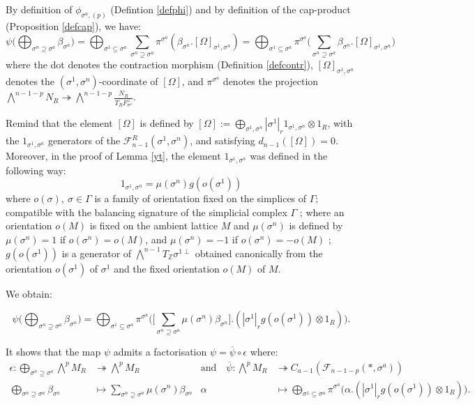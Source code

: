 \documentclass{article}
\begin{document}
By definition of $\phi_{\sigma^{a},(p)}$ (Defintion \ref{defphi}) and by definition of the cap-product (Proposition \ref{defcap}), we have:
\begin{equation*}
    \psi \Bigg( \bigoplus_{\sigma^n \supseteq \sigma^a} \beta_{\sigma^n} \Bigg) = \bigoplus_{\sigma^1 \subseteq \sigma^a} \sum_{\sigma^n \supseteq \sigma^a}\pi^{\sigma^a}(\beta_{\sigma^n}.[\Omega]_{\sigma^1,\sigma^n}) = \bigoplus_{\sigma^1 \subseteq \sigma^a} \pi^{\sigma^a} \Bigg( \sum_{\sigma^n \supseteq \sigma^a}\beta_{\sigma^n}.[\Omega]_{\sigma^1,\sigma^n} \Bigg)
\end{equation*}
where the dot denotes the contraction morphism (Definition \ref{defcontr}), $[\Omega]_{\sigma^1,\sigma^n}$ denotes the $(\sigma^1,\sigma^n)$-coordinate of $[\Omega]$, and $\pi^{\sigma^a}$ denotes the projection $\bigwedge^{n-1-p}N_R\twoheadrightarrow \bigwedge^{n-1-p}\frac{N_R}{T_RF_{\sigma^a}^{\perp}}$.

Remind that the element $[\Omega]$ is defined by $[\Omega]:=\bigoplus_{\sigma^1,\sigma^n} |\sigma^1|_r1_{\sigma^1,\sigma^n} \otimes 1_R$, with the $1_{\sigma^1,\sigma^n}$ generators of the $\mathcal{F}_{n-1}^R(\sigma^1,\sigma^n)$, and satisfying $d_{n-1}([\Omega]) =0$. Moreover, in the proof of Lemma \ref{yt}, the element $1_{\sigma^1,\sigma^n}$ was defined in the following way:
\begin{equation*}
    1_{\sigma^1,\sigma^n} = \mu(\sigma^n)g(o(\sigma^1))
\end{equation*}
where $o(\sigma), ~\sigma \in \Gamma$ is a family of orientation fixed on the simplices of $\Gamma$; compatible with the balancing signature of the simplicial complex $\Gamma$ ;  where an orientation $o(M)$ is fixed on the ambient lattice $M$ and $\mu(\sigma^n)$ is defined by $\mu(\sigma^n)=1$ if $o(\sigma^n)=o(M)$, and $\mu(\sigma^n)=-1$ if $o(\sigma^n)=-o(M)$ ; $g(o(\sigma^1))$ is a generator of $\bigwedge^{n-1}T_{\mathbb{Z}}\sigma^{1\perp}$ obtained canonically from the orientation $o(\sigma^1)$ of $\sigma^1$ and the fixed orientation $o(M)$ of $M$.

We obtain:

\begin{equation*}
    \psi \Bigg( \bigoplus_{\sigma^n \supseteq \sigma^a} \beta_{\sigma^n} \Bigg) = \bigoplus_{\sigma^1 \subseteq \sigma^a} \pi^{\sigma^a} \Bigg( \Bigg[ \sum_{\sigma^n \supseteq \sigma^a}\mu(\sigma^n)\beta_{\sigma^n}\Bigg].(|\sigma^1|_rg(o(\sigma^1))\otimes1_R) \Bigg).
\end{equation*}

It shows that the map $\psi$ admits a factorisation $\psi =\overline{\psi} \circ \epsilon$ where:
\begin{align*}
    \epsilon: \bigoplus_{\sigma^n \supseteq \sigma^a} \bigwedge^p M_R & \twoheadrightarrow \bigwedge^p M_R &\text{and }~~~ \overline{\psi}: \bigwedge^p M_R & \twoheadrightarrow  C_{a-1}(\mathcal{F}_{n-1-p}(*,\sigma^a)) \\
    \bigoplus_{\sigma^n \supseteq \sigma^a} \beta_{\sigma^n} & \mapsto \sum_{\sigma^n \supseteq \sigma^a} \mu(\sigma^n)\beta_{\sigma^n} & \alpha & \mapsto \bigoplus_{\sigma^1 \subseteq \sigma^a}\pi^{\sigma^a} \Bigg( \alpha.(|\sigma^1|_rg(o(\sigma^1))\otimes1_R) \Bigg) .
\end{align*}
\end{document}
